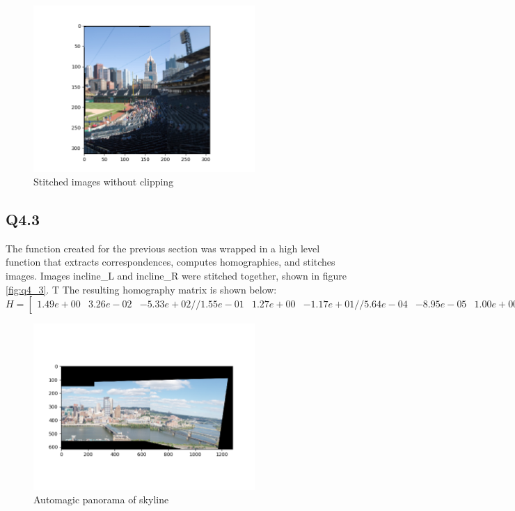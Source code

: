 \documentclass[12pt]{article}
\begin{document}
\begin{figure}[H]
\centering
\includegraphics[page=1,width=0.75\textwidth]{q4_1}
\caption{ Stitched images without clipping}
\label{fig:q42}
\end{figure}   

\subsection { Q4.3 }
The function created for the previous section was wrapped in a high level function that extracts correspondences, computes homographies, and stitches images. Images incline\_L and incline\_R were stitched together, shown in figure \ref{fig:q4_3}.
T
The resulting homography matrix is shown below:
$$
H = 
\begin {bmatrix}
1.49e+00 &  3.26e-02 & -5.33e+02 //
1.55e-01 &  1.27e+00 & -1.17e+01 //
5.64e-04 & -8.95e-05 &  1.00e+00
\end {bmatrix}
$$

\begin{figure}[H]
\centering
\includegraphics[page=1,width=0.75\textwidth]{q4_3}
\caption{ Automagic panorama of skyline}
\label{fig:q42}
\end{figure}   
\end{document}

